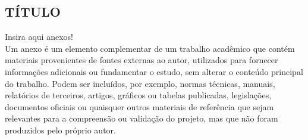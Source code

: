 
%
\begin{anexosenv}


\chapter{TÍTULO}

Insira aqui anexos!
\\
Um anexo é um elemento complementar de um trabalho acadêmico que contém materiais provenientes de fontes externas ao autor, utilizados para fornecer informações adicionais ou fundamentar o estudo, sem alterar o conteúdo principal do trabalho. Podem ser incluídos, por exemplo, normas técnicas, manuais, relatórios de terceiros, artigos, gráficos ou tabelas publicadas, legislações, documentos oficiais ou quaisquer outros materiais de referência que sejam relevantes para a compreensão ou validação do projeto, mas que não foram produzidos pelo próprio autor.

\end{anexosenv}
